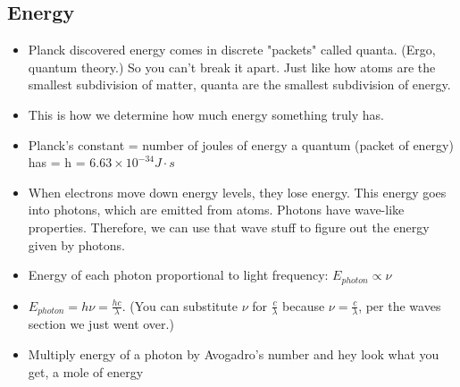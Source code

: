 \documentclass[letterpaper, 12pt]{article}
\begin{document}
	\subsection{Energy}
	\begin{itemize}
		\item Planck discovered energy comes in discrete "packets" called quanta. (Ergo, quantum theory.) So you can't break it apart. Just like how atoms are the smallest subdivision of matter, quanta are the smallest subdivision of energy.
		\item This is how we determine how much energy something truly has.
		\item Planck's constant = number of joules of energy a quantum (packet of energy) has = h = $6.63 \times 10^{-34} J \cdot s$
		\item When electrons move down energy levels, they lose energy. This energy goes into photons, which are emitted from atoms. Photons have wave-like properties. Therefore, we can use that wave stuff to figure out the energy given by photons.
		\item Energy of each photon proportional to light frequency: $E_{photon} \propto \nu$
		\item $E_{photon} = h \nu = \frac{hc}{\lambda}$. (You can substitute $\nu$ for $\frac{c}{\lambda}$ because $\nu = \frac{c}{\lambda}$, per the waves section we just went over.)
		\item Multiply energy of a photon by Avogadro's number and hey look what you get, a mole of energy
	\end{itemize}
\end{document}

